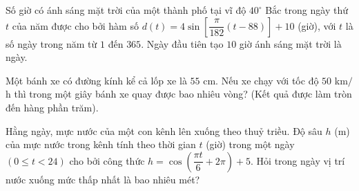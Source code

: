 \begin{ex}%
	Số giờ có ánh sáng mặt trời của một thành phố tại vĩ độ $40^\circ$ Bắc trong ngày thứ $t$ của năm được cho bởi hàm số $d(t) = 4 \sin\left[\dfrac{\pi}{182}(t - 88)\right] + 10$ (giờ), với $t$ là số ngày trong năm từ $1$ đến $365$. Ngày đầu tiên tạo $10$ giờ ánh sáng mặt trời là ngày.
\end{ex}

\begin{ex}%
	Một bánh xe có đường kính kể cả lốp xe là $55$ cm. Nếu xe chạy với tốc độ $50$ km$/$h thì trong một giây bánh xe quay được bao nhiêu vòng? (Kết quả được làm tròn đến hàng phần trăm).
\end{ex}

\begin{ex}%
	Hằng ngày, mực nước của một con kênh lên xuống theo thuỷ triều. Độ sâu $h$ (m) của mực nước trong kênh tính theo thời gian $t$ (giờ) trong một ngày $(0 \leq t<24)$ cho bởi công thức $h=\cos \left(\dfrac{\pi t}{6}+2 \pi\right)+5$. Hỏi trong ngày vị trí nước xuống mức thấp nhất là bao nhiêu mét?
	
\end{ex}


